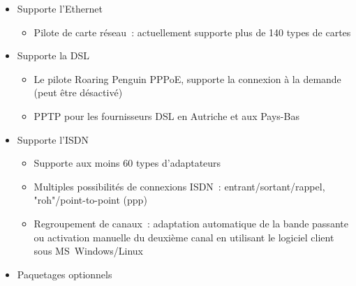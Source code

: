 \begin{itemize}
\item Supporte l'Ethernet

\begin{itemize}
\item Pilote de carte réseau~: actuellement supporte plus de 140 types de cartes
\end{itemize}

\item Supporte la DSL

\begin{itemize}
\item Le pilote Roaring Penguin PPPoE, supporte la connexion à la demande (peut
      être désactivé)
\item PPTP pour les fournisseurs DSL en Autriche et aux Pays-Bas
\end{itemize}

\item Supporte l'ISDN

\begin{itemize}
\item Supporte aux moins 60 types d'adaptateurs
\item Multiples possibilités de connexions ISDN~: entrant/sortant/rappel,
      "roh"/point-to-point (ppp)
\item Regroupement de canaux~: adaptation automatique de la bande passante ou
      activation manuelle du deuxième canal en utilisant le logiciel client
      sous MS~Windows/Linux
\end{itemize}

\item Paquetages optionnels


\end{itemize}
